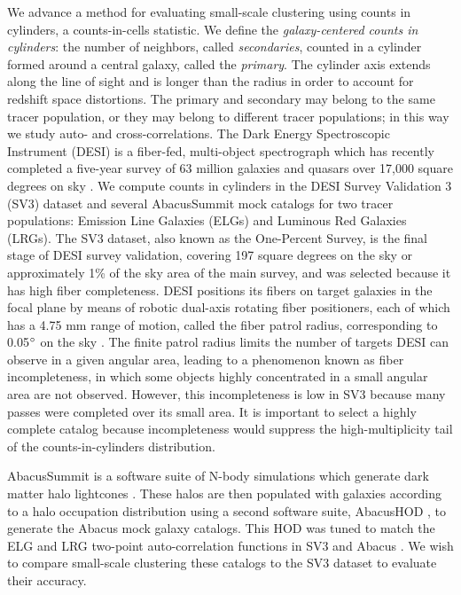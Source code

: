 \documentclass[fleqn,usenatbib]{mnras}
\begin{document}
We advance a method for evaluating small-scale clustering using counts in cylinders, a counts-in-cells statistic. We define the \textit{galaxy-centered counts in cylinders}: the number of neighbors, called \textit{secondaries}, counted in a cylinder formed around a central galaxy, called the \textit{primary}. The cylinder axis extends along the line of sight and is longer than the radius in order to account for redshift space distortions. The primary and secondary may belong to the same tracer population, or they may belong to different tracer populations; in this way we study auto- and cross-correlations.
The Dark Energy Spectroscopic Instrument (DESI) is a fiber-fed, multi-object spectrograph which has recently completed a five-year survey of 63 million galaxies and quasars over 17,000 square degrees on sky \citep{DESI2022.KP1.Instr,Corrector.Miller.2023, DESI2016b.Instr,Spectro.Pipeline.Guy.2023,SurveyOps.Schlafly.2023,DESI2024.I.DR1,DESI2024.VII.KP7B,DESI.DR2.DR2}.
We compute counts in cylinders in the DESI Survey Validation 3 (SV3) dataset and several AbacusSummit mock catalogs for two tracer populations: Emission Line Galaxies (ELGs) and Luminous Red Galaxies (LRGs). The SV3 dataset, also known as the One-Percent Survey, is the final stage of DESI survey validation, covering 197 square degrees on the sky \citep{collaboration_early_2024} or approximately 1\% of the sky area of the main survey, and was selected because it has high fiber completeness. DESI positions its fibers on target galaxies in the focal plane by means of robotic dual-axis rotating fiber positioners, each of which has a 4.75 mm range of motion, called the fiber patrol radius, corresponding to 0.05$\degree$ on the sky \citep{poppett_overview_2024}. The finite patrol radius limits the number of targets DESI can observe in a given angular area, leading to a phenomenon known as fiber incompleteness, in which some objects highly concentrated in a small angular area are not observed. However, this incompleteness is low in SV3 because many passes were completed over its small area. It is important to select a highly complete catalog because incompleteness would suppress the high-multiplicity tail of the counts-in-cylinders distribution. 

AbacusSummit is a software suite of N-body simulations which generate dark matter halo lightcones \citep{hadzhiyska_halo_2022}. These halos are then populated with galaxies according to a halo occupation distribution using a second software suite, AbacusHOD \citep{yuan_abacushod_2022}, to generate the Abacus mock galaxy catalogs. This HOD was tuned to match the ELG and LRG two-point auto-correlation functions in SV3 and Abacus \citep{rocher_desi_2024}. We wish to compare small-scale clustering these catalogs to the SV3 dataset to evaluate their accuracy.
\end{document}
